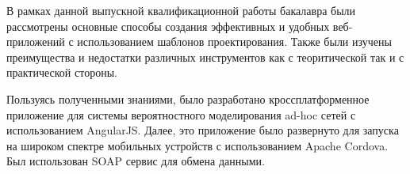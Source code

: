 
В рамках данной выпускной квалификационной работы бакалавра были рассмотрены основные способы создания эффективных и удобных веб-приложений с использованием шаблонов проектирования. Также были изучены преимущества и недостатки различных инструментов как с теоритической так и с практической стороны.

Пользуясь полученными знаниями, было разработано кроссплатформенное приложение для системы вероятностного моделирования ad-hoc сетей с использованием AngularJS. Далее, это приложение было развернуто для запуска на широком спектре мобильных устройств с использованием Apache Cordova. Был использован SOAP сервис для обмена данными.